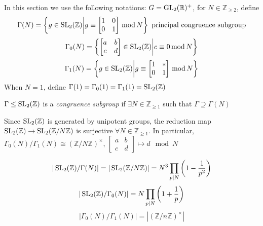 \documentclass[main]{subfiles}
\begin{document}
In this section we use the following notations: $G=\operatorname{GL}_2(\mathbb R)^+$, for $N\in\mathbb Z_{\geq2}$, define
\[\Gamma(N)=\left\{g\in\operatorname{SL}_2(\mathbb Z)\middle|g\equiv\begin{bmatrix}
1&0\\
0&1
\end{bmatrix}\,\mathrm{mod}\, N\right\}\text{ principal congruence subgroup}\]
\[\Gamma_0(N)=\left\{\begin{bmatrix}
a&b\\
c&d
\end{bmatrix}\in\operatorname{SL}_2(\mathbb Z)\middle|c\equiv0\,\mathrm{mod}\, N\right\}\]
\[\Gamma_1(N)=\left\{g\in\operatorname{SL}_2(\mathbb Z)\middle|g\equiv\begin{bmatrix}
1&*\\
0&1
\end{bmatrix}\,\mathrm{mod}\, N\right\}\]
When $N=1$, define $\Gamma(1)=\Gamma_0(1)=\Gamma_1(1)=\operatorname{SL}_2(\mathbb Z)$

\begin{definition}
$\Gamma\leq\operatorname{SL}_2(\mathbb Z)$ is a \textit{congruence subgroup} if $\exists N\in\mathbb Z_{\geq1}$ such that $\Gamma\supseteq\Gamma(N)$
\end{definition}

Since $\operatorname{SL}_2(\mathbb Z)$ is generated by unipotent groups, the reduction map $\operatorname{SL}_2(\mathbb Z)\to\operatorname{SL}_2(\mathbb Z/N\mathbb Z)$ is surjective $\forall N\in\mathbb Z_{\geq1}$. In particular, $\Gamma_0(N)/\Gamma_1(N)\cong(\mathbb Z/N\mathbb Z)^\times$, $\begin{bmatrix}
a&b\\
c&d
\end{bmatrix}\mapsto d\mod N$

\begin{lemma}
\[|\operatorname{SL}_2(\mathbb Z)/\Gamma(N)|=|\operatorname{SL}_2(\mathbb Z/N\mathbb Z)|=N^3\prod_{p|N}\left(1-\frac{1}{p^2}\right)\]
\[|\operatorname{SL}_2(\mathbb Z)/\Gamma_0(N)|=N\prod_{p|N}\left(1+\frac{1}{p}\right)\]
\[|\Gamma_0(N)/\Gamma_1(N)|=|(\mathbb Z/n\mathbb Z)^\times|\]
\end{lemma}
\end{document}
